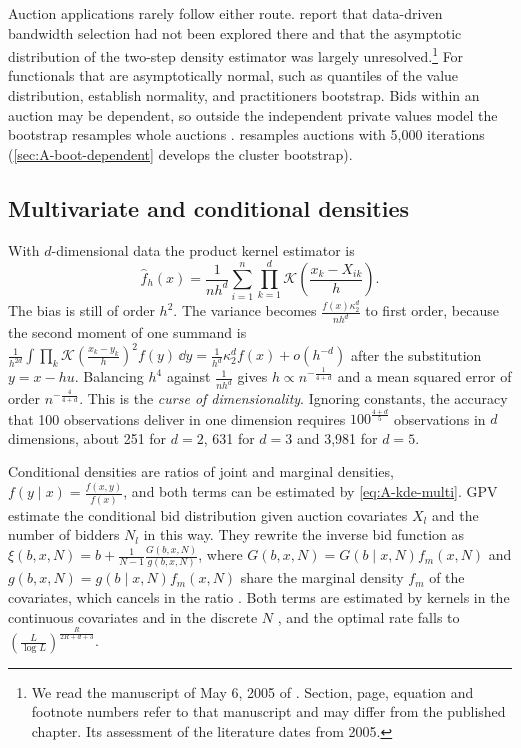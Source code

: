 Auction applications rarely follow either route. \citet[Section~3.2.1, p.~21]{AtheyHaile2007} report
that data-driven bandwidth selection had not been explored there and that the asymptotic distribution of
the two-step density estimator was largely unresolved.\footnote{We read the manuscript of May 6, 2005 of
\citet{AtheyHaile2007}. Section, page, equation and footnote numbers refer to that manuscript and may
differ from the published chapter. Its assessment of the literature dates from 2005.} For functionals
that are asymptotically normal, such as quantiles of the value distribution, \citet{HaileHongShum2003}
establish normality, and practitioners bootstrap. Bids within an auction may be dependent, so outside
the independent private values model the bootstrap resamples whole auctions
\citep[Section~3.2.1, p.~21]{AtheyHaile2007}. \citet{Asker2010} resamples auctions with 5,000
iterations (\cref{sec:A-boot-dependent} develops the cluster bootstrap).

\subsection{Multivariate and conditional densities}\label{sec:A-kde-multi}

With $d$-dimensional data the product kernel estimator is
\begin{equation}\label{eq:A-kde-multi}
\hat f_h(x)=\frac{1}{nh^d}\sum_{i=1}^{n}\prod_{k=1}^{d}\mathcal{K}\!\left(\frac{x_k-X_{ik}}{h}\right).
\end{equation}
The bias is still of order $h^2$. The variance becomes $\frac{f(x)\kappa_2^d}{nh^d}$ to first order,
because the second moment of one summand is
$\frac{1}{h^{2d}}\int\prod_k\mathcal{K}(\frac{x_k-y_k}{h})^2f(y)\,\dd y=\frac{1}{h^d}\kappa_2^df(x)+o(h^{-d})$
after the substitution $y=x-hu$. Balancing $h^4$ against $\frac{1}{nh^d}$ gives
$h\propto n^{-\frac{1}{4+d}}$ and a mean squared error of order $n^{-\frac{4}{4+d}}$. This is the
\emph{curse of dimensionality}. Ignoring constants, the accuracy that 100 observations deliver in one
dimension requires $100^{\frac{4+d}{5}}$ observations in $d$ dimensions, about 251 for $d=2$, 631 for
$d=3$ and 3,981 for $d=5$.

Conditional densities are ratios of joint and marginal densities, $f(y\mid x)=\frac{f(x,y)}{f(x)}$, and
both terms can be estimated by \eqref{eq:A-kde-multi}. GPV estimate the conditional bid distribution
given auction covariates $X_l$ and the number of bidders $N_l$ in this way. They rewrite the inverse bid
function as $\xi(b,x,N)=b+\frac{1}{N-1}\frac{G(b,x,N)}{g(b,x,N)}$, where $G(b,x,N)=G(b\mid x,N)f_m(x,N)$
and $g(b,x,N)=g(b\mid x,N)f_m(x,N)$ share the marginal density $f_m$ of the covariates, which cancels
in the ratio \citep[eq.~(12)]{GuerrePerrigneVuong2000}. Both terms are estimated by kernels in the
continuous covariates and in the discrete $N$ \citep[eqs.~(13)--(14)]{GuerrePerrigneVuong2000}, and the
optimal rate falls to $(\frac{L}{\log L})^{\frac{R}{2R+d+3}}$.

